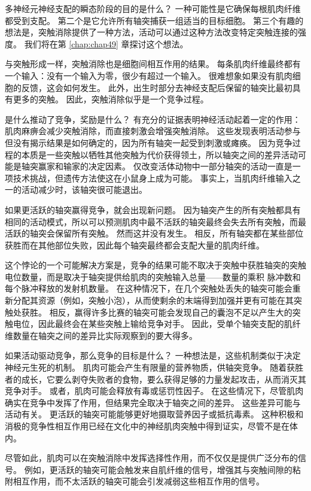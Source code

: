 多神经元神经支配的瞬态阶段的目的是什么？ 一种可能性是它确保每根肌肉纤维都受到支配。 第二个是它允许所有轴突捕获一组适当的目标细胞。 第三个有趣的想法是，突触消除提供了一种方法，活动可以通过这种方法改变特定突触连接的强度。 我们将在第 \ref{chap:chap49} 章探讨这个想法。

与突触形成一样，突触消除也是细胞间相互作用的结果。 每条肌肉纤维最终都有一个输入：没有一个输入为零，很少有超过一个输入。 很难想象如果没有肌肉细胞的反馈，这会如何发生。 此外，出生时部分去神经支配后保留的轴突比最初具有更多的突触。 因此，突触消除似乎是一个竞争过程。

是什么推动了竞争，奖励是什么？ 有充分的证据表明神经活动起着一定的作用：肌肉麻痹会减少突触消除，而直接刺激会增强突触消除。 这些发现表明活动参与但没有揭示结果是如何确定的，因为所有轴突一起受到刺激或瘫痪。 因为竞争过程的本质是一些突触以牺牲其他突触为代价获得领土，所以轴突之间的差异活动可能是轴突赢家和输家的决定因素。 仅改变活体动物中一部分轴突的活动一直是一项技术挑战，但遗传方法使这在小鼠身上成为可能。 事实上，当肌肉纤维输入之一的活动减少时，该轴突很可能退出。

如果更活跃的轴突赢得竞争，就会出现新问题。 因为轴突产生的所有突触都具有相同的活动模式，所以可以预测肌肉中最不活跃的轴突最终会失去所有突触，而最活跃的轴突会保留所有突触。 然而这并没有发生。 相反，所有轴突都在某些部位获胜而在其他部位失败，因此每个轴突最终都会支配大量的肌肉纤维。

这个悖论的一个可能解决方案是，竞争的结果可能不取决于突触中获胜轴突的突触电位数量，而是取决于轴突提供给肌肉的突触输入总量——数量的乘积 脉冲数和每个脉冲释放的发射机数量。 在这种情况下，在几个突触处丢失的轴突可能会重新分配其资源（例如，突触小泡），从而使剩余的末端得到加强并更有可能在其突触处获胜。 相反，赢得许多比赛的轴突可能会发现自己的囊泡不足以产生大的突触电位，因此最终会在某些突触上输给竞争对手。 因此，受单个轴突支配的肌纤维数量在轴突之间的差异比实际观察到的要大得多。

如果活动驱动竞争，那么竞争的目标是什么？ 一种想法是，这些机制类似于决定神经元生死的机制。 肌肉可能会产生有限量的营养物质，供轴突竞争。 随着获胜者的成长，它要么剥夺失败者的食物，要么获得足够的力量发起攻击，从而消灭其竞争对手。 或者，肌肉可能会释放有毒或惩罚性因子。 在这些情况下，尽管肌肉确实在竞争中发挥了作用，但结果完全取决于轴突之间的差异。 这些差异可能与活动有关。 更活跃的轴突可能能够更好地摄取营养因子或抵抗毒素。 这种积极和消极的竞争性相互作用已经在文化中的神经肌肉突触中得到证实，尽管不是在体内。

尽管如此，肌肉可以在突触消除中发挥选择性作用，而不仅仅是提供广泛分布的信号。 例如，更活跃的轴突可能会触发来自肌纤维的信号，增强其与突触间隙的粘附相互作用，而不太活跃的轴突可能会引发减弱这些相互作用的信号。


